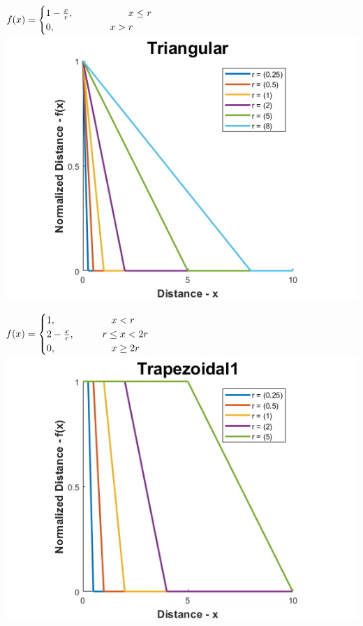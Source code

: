 \documentclass[12pt, a4paper, titlepage, openany]{book}
\begin{document}
\begin{description}[labelsep=1cm, labelwidth=2cm, nosep,,style=multiline,leftmargin=3cm]
\begin{description}[labelsep=14em, labelwidth=10em, nosep,style=multiline,leftmargin=6cm]
	\item[\texttt{"triangular"}]	  $f(x) = \begin{cases} 1 - \frac{x}{r},  \hspace{20mm}  x\le r 
	\\ 0,  \hspace{20mm}  x>r \end{cases}$\\
		\includegraphics[scale=.5]{FuzzTriv1.png} \\

	\item[\texttt{"trapezoidal1"}]	  $f(x) = \begin{cases} 1,  \hspace{20mm}  x<r 
	\\ 2 - \frac{x}{r},  \hspace{10mm} r\le x<2r 
	\\ 0,  \hspace{20mm}  x\ge 2r \end{cases}$\\
		\includegraphics[scale=.5]{FuzzTrap1v1.png} \\ 


\end{description}
\end{description}
\end{document}
